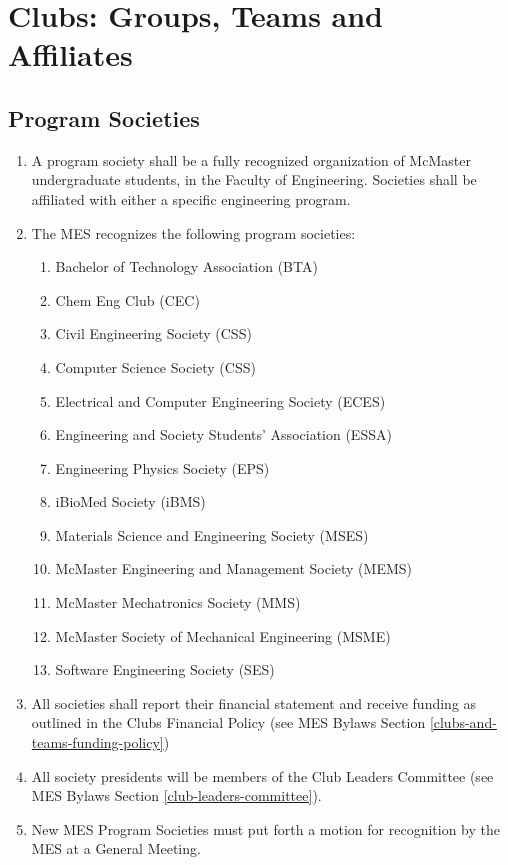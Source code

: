 \section{Clubs: Groups, Teams and Affiliates}
\label{clubs-groups-teams-and-affiliates}

\subsection{Program Societies}
\label{program-societies}
\begin{enumerate}
 \item
  A program society shall be a fully recognized organization of McMaster undergraduate students, in the Faculty of Engineering. Societies shall be affiliated with either a specific engineering program.
 \item
  The MES recognizes the following program societies:

  \begin{enumerate}
   \item
    Bachelor of Technology Association (BTA)
   \item
    Chem Eng Club (CEC)
   \item
    Civil Engineering Society (CSS)
   \item
    Computer Science Society (CSS)
   \item
    Electrical and Computer Engineering Society (ECES)
   \item
    Engineering and Society Students' Association (ESSA)
   \item
    Engineering Physics Society (EPS)
   \item
    iBioMed Society (iBMS)
   \item
    Materials Science and Engineering Society (MSES)
   \item
    McMaster Engineering and Management Society (MEMS)
   \item
    McMaster Mechatronics Society (MMS)
   \item
    McMaster Society of Mechanical Engineering (MSME)
   \item
    Software Engineering Society (SES)
  \end{enumerate}
 \item
  All societies shall report their financial statement and receive funding as outlined in the Clubs Financial Policy (see MES Bylaws Section \ref{clubs-and-teams-funding-policy})
 \item
  All society presidents will be members of the Club Leaders Committee (see MES Bylaws Section \ref{club-leaders-committee}).
 \item
  New MES Program Societies must put forth a motion for recognition by the MES at a General Meeting.

\end{enumerate}

